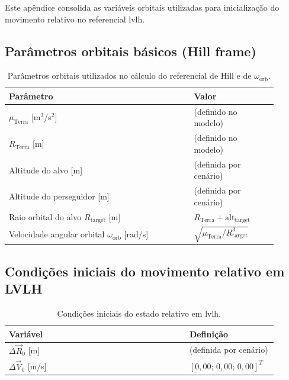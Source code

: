 Este apêndice consolida as variáveis orbitais utilizadas para inicialização do movimento relativo no referencial \gls{lvlh}.

\subsection{Parâmetros orbitais básicos (Hill frame)}
\label{apF:param_orbitais}

\begin{table}[H]
\centering
\caption{Parâmetros orbitais utilizados no cálculo do referencial de Hill e de $\omega_{\text{orb}}$.}
\label{tab:apF_param_orbitais}
\begin{tabular}{|p{0.62\linewidth}|p{0.28\linewidth}|}
\hline
\textbf{Parâmetro} & \textbf{Valor}\\
\hline
$\mu_{\text{Terra}}$ [m$^3$/s$^2$] & (definido no modelo)\\
\hline
$R_{\text{Terra}}$ [m] & (definido no modelo)\\
\hline
Altitude do alvo [m] & (definida por cenário)\\
\hline
Altitude do perseguidor [m] & (definida por cenário)\\
\hline
Raio orbital do alvo $R_{\text{target}}$ [m] & $R_{\text{Terra}}+\text{alt}_{\text{target}}$\\
\hline
Velocidade angular orbital $\omega_{\text{orb}}$ [rad/s] & $\sqrt{\mu_{\text{Terra}}/R_{\text{target}}^3}$\\
\hline
\end{tabular}
\end{table}

\subsection{Condições iniciais do movimento relativo em LVLH}
\label{apF:cond_iniciais_lvlh}

\begin{table}[H]
\centering
\caption{Condições iniciais do estado relativo em \gls{lvlh}.}
\label{tab:apF_cond_iniciais_lvlh}
\begin{tabular}{|p{0.62\linewidth}|p{0.28\linewidth}|}
\hline
\textbf{Variável} & \textbf{Definição}\\
\hline
$\Delta \vec{R}_0$ [m] & (definida por cenário)\\
\hline
$\Delta \vec{V}_0$ [m/s] & $[0,00;\,0,00;\,0,00]^T$\\
\hline
\end{tabular}
\end{table}

